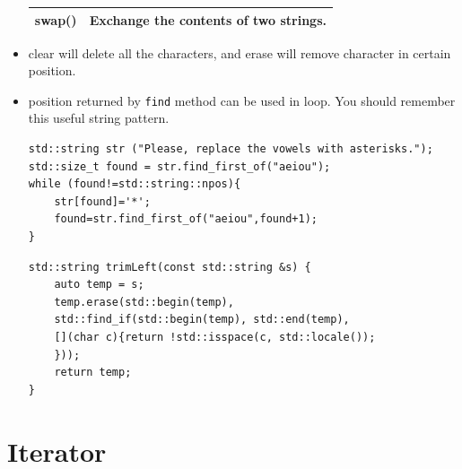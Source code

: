 \documentclass[a4paper,11pt,twoside]{book}
\newcommand{\tophline}{\hline }
\newcommand{\bottomhline}{\\ \hline }
\newcommand{\tophline}{ }
\newcommand{\bottomhline}{ }
\begin{document}
\begin{itemize}
\begin{tabular}{| p{} |p{}|}
		\tophline
		swap() & Exchange the contents of two strings. \bottomhline
	\end{tabular}
	
	\item clear will delete all the characters, and erase will remove character in certain position.
	
	\item position returned by \texttt{find} method can be used in loop. You should remember this useful string pattern.
\begin{lstlisting}[numbers=none]
std::string str ("Please, replace the vowels with asterisks.");
std::size_t found = str.find_first_of("aeiou");
while (found!=std::string::npos){
	str[found]='*';
	found=str.find_first_of("aeiou",found+1);
}
\end{lstlisting}

\begin{lstlisting}[numbers=none]
std::string trimLeft(const std::string &s) {
	auto temp = s;
	temp.erase(std::begin(temp), 
	std::find_if(std::begin(temp), std::end(temp), 
	[](char c){return !std::isspace(c, std::locale()); 
	}));
	return temp;
}
\end{lstlisting}

	
\end{itemize}


\section{Iterator}
\end{document}
